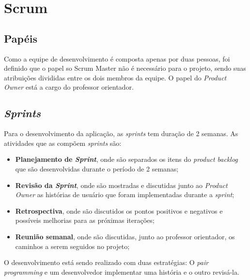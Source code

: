 \section{Scrum}

\subsection{Papéis}
Como a equipe de desenvolvimento é composta apenas por duas pessoas, foi definido que o papel so Scrum Master não é necessário para o projeto, sendo suas atribuições divididas entre os dois membros da equipe. O papel do \textit{Product Owner} está a cargo do professor orientador.

\subsection{\textit{Sprints}}
Para o desenvolvimento da aplicação, as \textit{sprints} tem duração de 2 semanas. As atividades que as compõem \textit{sprints} são: 
\begin{itemize}
  \item \textbf{Planejamento de \textit{Sprint}}, onde são separados os itens do \textit{product backlog} que são desenvolvidas durante o período de 2 semanas;
  \item \textbf{Revisão da \textit{Sprint}}, onde são mostradas e discutidas junto ao \textit{Product Owner} as histórias de usuário que foram implementadas durante a \textit{sprint};
  \item \textbf{Retrospectiva}, onde são discutidos os pontos positivos e negativos e possíveis melhorias para as próximas iterações;
  \item \textbf{Reunião semanal}, onde são discutidas, junto ao professor orientador, os caminhos a serem seguidos no projeto;
\end{itemize}
O desenvolvimento está sendo realizado com duas estratégias: O \textit{pair programming} e um desenvolvedor implementar uma história e o outro revisá-la.
